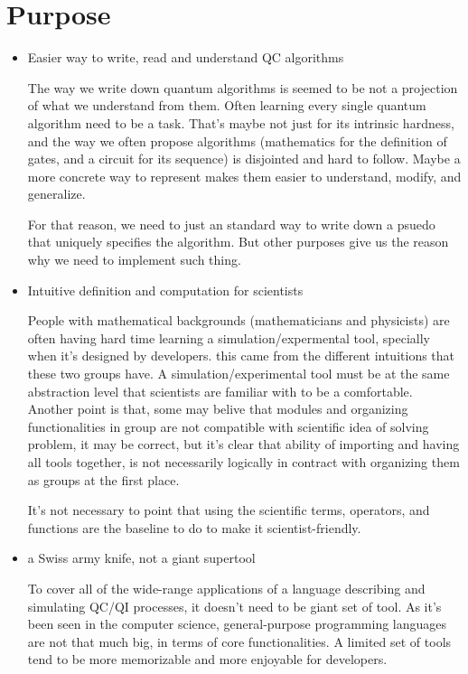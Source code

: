 \documentclass[a4paper,11pt]{article}
\begin{document}
\section{Purpose}
\begin{itemize}
\item Easier way to write, read and understand QC algorithms

The way we write down quantum algorithms is seemed to be not a projection of what we understand from them. Often learning every single quantum algorithm need to be a task. That's maybe not just for its intrinsic hardness, and the way we often propose algorithms (mathematics for the definition of gates, and a circuit for its sequence) is disjointed and hard to follow. Maybe a more concrete way to represent makes them easier to understand, modify, and generalize.

For that reason, we need to just an standard way to write down a psuedo that uniquely specifies the algorithm. But other purposes give us the reason why we need to implement such thing.

\item Intuitive definition and computation for scientists

People with mathematical backgrounds (mathematicians and physicists) are often having hard time learning a simulation/expermental tool, specially when it's designed by developers. this came from the different intuitions that these two groups have.
A simulation/experimental tool must be at the same abstraction level that scientists are familiar with to be a comfortable. Another point is that, some may belive that modules and organizing functionalities in group are not compatible with scientific idea of solving problem, it may be correct, but it's clear that ability of importing and having all tools together, is not necessarily logically in contract with organizing them as groups at the first place.

It's not necessary to point that using the scientific terms, operators, and functions are the baseline to do to make it scientist-friendly.

\item a Swiss army knife, not a giant supertool

To cover all of the wide-range applications of a language describing and simulating QC/QI processes, it doesn't need to be giant set of tool. As it's been seen in the computer science, general-purpose programming languages are not that much big, in terms of core functionalities. A limited set of tools tend to be more memorizable and more enjoyable for developers. 


\end{itemize}
\end{document}
